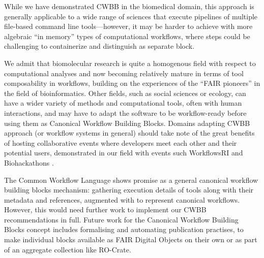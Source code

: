 While we have demonstrated CWBB in the biomedical domain, this approach is generally applicable to a wide range of sciences that execute pipelines of multiple file-based command line tools---however, it may be harder to achieve with more algebraic ``in memory'' types of computational workflows, where steps could be challenging to containerize and distinguish as separate block.

We admit that biomolecular research is quite a homogenous field with respect to computational analyses and now becoming relatively mature in terms of tool composability in workflows, building on the experiences of the ``FAIR pioneers'' in the field of bioinformatics.
Other fields, such as social sciences or ecology, can have a wider variety of methods and computational tools, often with human interactions, and may have to adapt the software to be workflow-ready \cite{Brack 2022a} before using them as Canonical Workflow Building Blocks.
Domains adapting CWBB approach (or workflow systems in general) should take note of the great benefits of hosting collaborative events where developers meet each other and their potential users, demonstrated in our field with events such WorkflowsRI \cite{Ferreira da Silva 2021} and Biohackathons \cite{Garcia 2020}.

The Common Workflow Language shows promise as a general canonical workflow building blocks mechanism: gathering execution details of tools along with their metadata and references, augmented with  to represent canonical workflows.
However, this would need further work to implement our CWBB recommendations in full.
Future work for the Canonical Workflow Building Blocks concept includes formalising and automating publication practises, to make individual blocks available as FAIR Digital Objects on their own or as part of an aggregate collection like RO-Crate.

